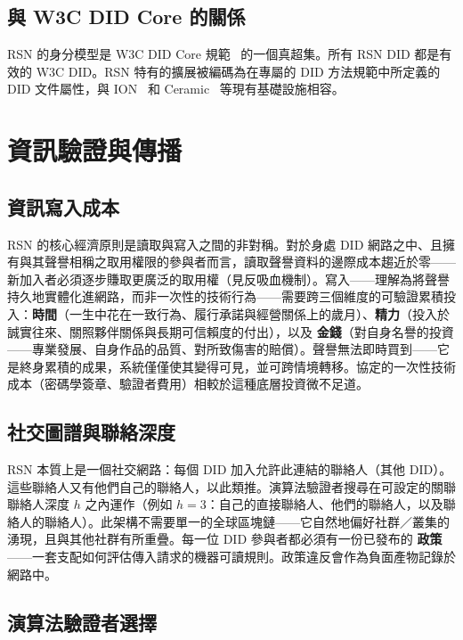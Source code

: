 \documentclass[11pt,a4paper,twocolumn]{article}
\begin{document}
\subsection{與 W3C DID Core 的關係}

RSN 的身分模型是 W3C DID Core 規範~\cite{did2022} 的一個真超集。所有 RSN DID 都是有效的 W3C DID。RSN 特有的擴展被編碼為在專屬的 DID 方法規範中所定義的 DID 文件屬性，與 ION~\cite{buchner2021} 和 Ceramic~\cite{ceramic2023} 等現有基礎設施相容。

\section{資訊驗證與傳播}

\subsection{資訊寫入成本}

RSN 的核心經濟原則是讀取與寫入之間的非對稱。對於身處 DID 網路之中、且擁有與其聲譽相稱之取用權限的參與者而言，讀取聲譽資料的邊際成本趨近於零——新加入者必須逐步賺取更廣泛的取用權（見反吸血機制）。寫入——理解為將聲譽持久地實體化進網路，而非一次性的技術行為——需要跨三個維度的可驗證累積投入：\textbf{時間}（一生中花在一致行為、履行承諾與經營關係上的歲月）、\textbf{精力}（投入於誠實往來、關照夥伴關係與長期可信賴度的付出），以及 \textbf{金錢}（對自身名譽的投資——專業發展、自身作品的品質、對所致傷害的賠償）。聲譽無法即時買到——它是終身累積的成果，系統僅僅使其變得可見，並可跨情境轉移。協定的一次性技術成本（密碼學簽章、驗證者費用）相較於這種底層投資微不足道。

\subsection{社交圖譜與聯絡深度}

RSN 本質上是一個社交網路：每個 DID 加入允許此連結的聯絡人（其他 DID）。這些聯絡人又有他們自己的聯絡人，以此類推。演算法驗證者搜尋在可設定的關聯聯絡人深度 $h$ 之內運作（例如 $h=3$：自己的直接聯絡人、他們的聯絡人，以及聯絡人的聯絡人）。此架構不需要單一的全球區塊鏈——它自然地偏好社群／叢集的湧現，且與其他社群有所重疊。每一位 DID 參與者都必須有一份已發布的 \textbf{政策}——一套支配如何評估傳入請求的機器可讀規則。政策違反會作為負面產物記錄於網路中。

\subsection{演算法驗證者選擇}
\end{document}
